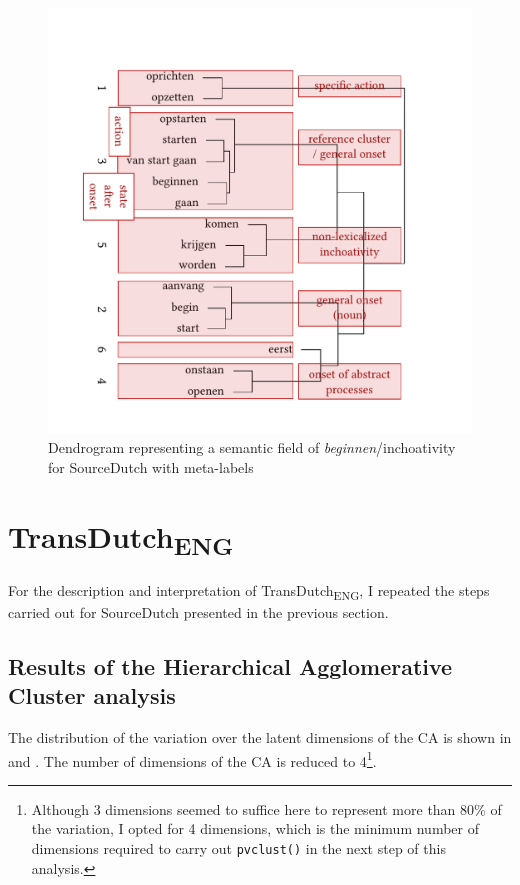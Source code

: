 \begin{figure}
\includegraphics[width=\textwidth]{figures/tree62.pdf}
\caption{\label{fig:4:61b}  Dendrogram representing a semantic field of \textit{beginnen}/inchoativity for SourceDutch with meta-labels}
\end{figure}

\section{TransDutch\textsubscript{ENG}}
\label{sec:4.3}  
For the description and interpretation of TransDutch\textsubscript{ENG}, I repeated the steps carried out for SourceDutch presented in the previous section.

\subsection{Results of the Hierarchical Agglomerative Cluster analysis}
\label{sec:4.3.1}  
The distribution of the variation over the latent dimensions of the CA is shown in  and . The number of dimensions of the CA is reduced to 4\footnote{Although 3 dimensions seemed to suffice here to represent more than 80\% of the variation, I opted for 4 dimensions, which is the minimum number of dimensions required to carry out \texttt{pvclust()} in the next step of this analysis.}.


